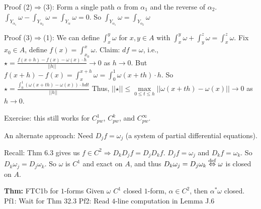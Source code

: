 \documentclass[10pt,letterpaper]{article}
\newcommand{\n}{\hfill\break}
\newcommand{\thm}[1]{\par\noindent\settowidth{\hangindent}{\textbf{Thm: }}\textbf{Thm: }#1\n}
\newcommand{\ptxt}[1]{\textrm{\textnormal{#1}}}
\newcommand{\abs}[1]{\left|#1\right|}
\newcommand{\norm}[1]{\abs{\abs{#1}}}
\begin{document}
\par\noindent Proof (2)$\Rightarrow$(3): Form a single path $\alpha$ from $\alpha_{1}$ and the reverse of $\alpha_{2}$.\n
$\displaystyle\int_{Y_{\alpha_{1}}}\omega-\int_{Y_{\alpha_{2}}}\omega=\int_{Y_{\alpha}}\omega=0$. So $\displaystyle\int_{Y_{\alpha_{1}}}\omega=\int_{Y_{\alpha_{2}}}\omega$\n

\par\noindent Proof (3)$\Rightarrow$(1): We can define $\int_{x}^{y}\omega$ for $x,y\in{}A$ with $\int_{x}^{y}\omega+\int_{y}^{z}\omega=\int_{x}^{z}\omega$. Fix $x_{0}\in{}A$, define $f(x)=\int_{x_{0}}^{x}\omega$.\n
Claim: $df=\omega$, i.e., $\star=\frac{f(x+h)-f(x)-\omega(x)\cdot{}h}{\norm{h}}\to{}0$ as $h\to{}0$.\n
But $f(x+h)-f(x)=\int_{x}^{x+h}\omega=\int_{0}^{1}\omega(x+th)\cdot{}h$. So $\star=\frac{\int_{0}^{1}(\omega(x+th)-\omega(x))\cdot{}hdt}{\norm{h}}$\n
Thus, $\norm{\star}\le\underset{0\le{}t\le{}h}{\max}\norm{\omega(x+th)-\omega(x)}\to{}0$ as $h\to{}0$.\n

\par\noindent Exercise: this still works for $C_{pw}^{1}$, $C_{pw}^{k}$, and $C_{pw}^{\infty}$.\n

\par\noindent An alternate approach: Need $D_{j}f=\omega_{j}$ (a system of partial differential equations).\n

\par\noindent Recall: Thm 6.3 gives us $f\in{}C^{2}\Rightarrow{}D_{k}D_{j}f=D_{j}D_{k}f$. $D_{j}f=\omega_{j}$ and $D_{k}f=\omega_{k}$. So $D_{k}\omega_{j}=D_{j}\omega_{k}$.\n
So $\omega$ is $C^{1}$ and exact on $A$, and thus $D_{k}\omega_{j}=D_{j}\omega_{k}\overset{\ptxt{def}}{\Leftrightarrow}\omega$ is closed on $A$.\n

\thm{FTC1b for $1$-forms\n
Given $\omega$ $C^{1}$ closed $1$-form, $\alpha\in{}C^{2}$, then $\alpha^{*}\omega$ closed.\n
Pf1: Wait for Thm 32.3\n
Pf2: Read $4$-line computation in Lemma J.6}
\end{document}
